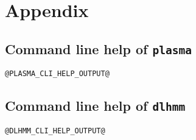 \documentclass[a4paper]{article}
\newcommand{\plasma}[0]{\texttt{plasma}}
\newcommand{\dlhmm}[0]{\texttt{dlhmm}}
\begin{document}
\section{Appendix}
\subsection{Command line help of \plasma{}}
\label{appendix:plasma-cli-help}
\begin{verbatim}
@PLASMA_CLI_HELP_OUTPUT@
\end{verbatim}

\subsection{Command line help of \dlhmm{}}
\label{appendix:dlhmm-cli-help}
\begin{verbatim}
@DLHMM_CLI_HELP_OUTPUT@
\end{verbatim}



\nocite{*}


\end{document}
